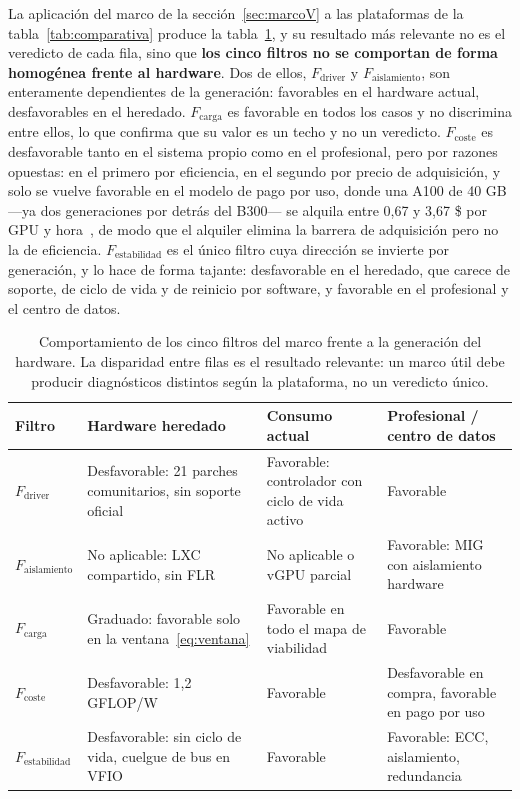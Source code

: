 \documentclass[a4paper,11pt]{article}
\begin{document}
La aplicación del marco de la sección~\ref{sec:marcoV} a las plataformas de la tabla~\ref{tab:comparativa} produce la
tabla~\ref{tab:filtros}, y su resultado más relevante no es el veredicto de cada fila, sino que \textbf{los cinco filtros no se
comportan de forma homogénea frente al hardware}. Dos de ellos, $F_{\text{driver}}$ y $F_{\text{aislamiento}}$, son enteramente
dependientes de la generación: favorables en el hardware actual, desfavorables en el heredado. $F_{\text{carga}}$ es favorable en
todos los casos y no discrimina entre ellos, lo que confirma que su valor es un techo y no un veredicto. $F_{\text{coste}}$ es
desfavorable tanto en el sistema propio como en el profesional, pero por razones opuestas: en el primero por eficiencia, en el
segundo por precio de adquisición, y solo se vuelve favorable en el modelo de pago por uso, donde una A100 de 40 GB ---ya dos
generaciones por detrás del B300--- se alquila entre 0,67 y 3,67 \$ por GPU y hora~\cite{cloudgpus}, de modo que el alquiler elimina
la barrera de adquisición pero no la de eficiencia. $F_{\text{estabilidad}}$ es el único filtro cuya dirección se invierte por
generación, y lo hace de forma tajante: desfavorable en el heredado, que carece de soporte, de ciclo de vida y de reinicio por
software, y favorable en el profesional y el centro de datos.

\begin{table}[t]
\centering
\footnotesize
\caption{Comportamiento de los cinco filtros del marco frente a la generación del hardware. La disparidad entre filas es el
resultado relevante: un marco útil debe producir diagnósticos distintos según la plataforma, no un veredicto único.}
\label{tab:filtros}
\begin{tabular}{>{\raggedright\arraybackslash}p{2.6cm} >{\raggedright\arraybackslash}p{3.4cm} >{\raggedright\arraybackslash}p{3.4cm} >{\raggedright\arraybackslash}p{3.4cm}}
\toprule
\textbf{Filtro} & \textbf{Hardware heredado} & \textbf{Consumo actual} & \textbf{Profesional / centro de datos} \\
\midrule
$F_{\text{driver}}$ & Desfavorable: 21 parches comunitarios, sin soporte oficial & Favorable: controlador con ciclo de vida activo & Favorable \\
$F_{\text{aislamiento}}$ & No aplicable: LXC compartido, sin FLR & No aplicable o vGPU parcial & Favorable: MIG con aislamiento hardware \\
$F_{\text{carga}}$ & Graduado: favorable solo en la ventana~\eqref{eq:ventana} & Favorable en todo el mapa de viabilidad & Favorable \\
$F_{\text{coste}}$ & Desfavorable: 1,2 GFLOP/W & Favorable & Desfavorable en compra, favorable en pago por uso \\
$F_{\text{estabilidad}}$ & Desfavorable: sin ciclo de vida, cuelgue de bus en VFIO & Favorable & Favorable: ECC, aislamiento, redundancia \\
\bottomrule
\end{tabular}
\end{table}
\end{document}
